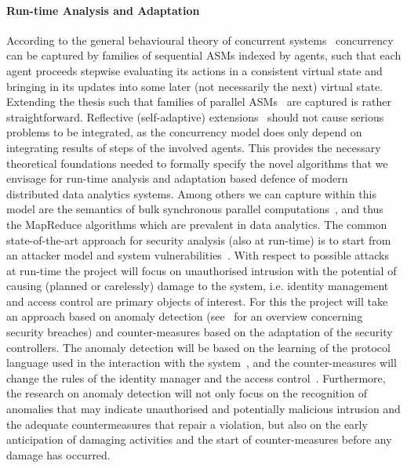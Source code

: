 \documentclass[a4paper,11pt]{article}
\begin{document}


\paragraph{Run-time Analysis and Adaptation}
According to the general behavioural theory of concurrent systems~\cite{BorgerS16} concurrency can be captured by families of sequential ASMs indexed by agents, such that each agent proceeds stepwise evaluating its actions in a consistent virtual state and bringing in its updates into some later (not necessarily the next) virtual state. Extending the thesis such that families of parallel ASMs~\cite{FerrarottiSTW16} are captured is rather straightforward. Reflective (self-adaptive) extensions~\cite{abs-2001-01873} should not cause serious problems to be integrated, as the concurrency model does only depend on integrating results of steps of the involved agents. This provides the necessary theoretical foundations  needed to formally specify the novel algorithms that we envisage for run-time analysis and adaptation based defence of modern distributed data analytics systems. Among others we can capture within this model are the semantics of bulk synchronous parallel computations~\cite{FerrarottiGS19}, and thus the MapReduce algorithms which are prevalent in data analytics. 
%
The common state-of-the-art approach for security analysis (also at run-time) is to start from an attacker model and system vulnerabilities~\cite{Biskup09}. With respect to possible attacks at run-time the project will focus on unauthorised intrusion with the potential of causing (planned or carelessly) damage to the system, i.e. identity management and access control are primary objects of interest. For this the project will take an approach based on anomaly detection (see~\cite{BaileyCL14} for an overview concerning security breaches) and counter-measures based on the adaptation of the security controllers. The anomaly detection will be based on the learning of the protocol language used in the interaction with the system~\cite{Lampesberger13}, and the counter-measures will change the rules of the identity manager and the access control~\cite{BaileyCL14}. Furthermore, the research on anomaly detection will not only focus on the recognition of anomalies that may indicate unauthorised and potentially malicious intrusion and the adequate countermeasures that repair a violation, but also on the early anticipation of damaging activities and the start of counter-measures before any damage has occurred. 
\end{document}

